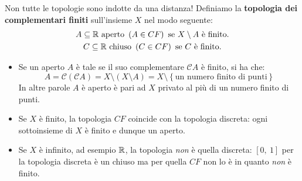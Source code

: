 \begin{attention}
	Non tutte le topologie sono indotte da una distanza! Definiamo la \textbf{topologia dei complementari finiti} sull'insieme $X$ nel modo seguente:
	\begin{gather*}
		A\subseteq \mathbb{R} \text{ aperto } \left(A\in CF\right) \text{ se }  X\setminus A \text{ è finito.}\\
		C\subseteq \mathbb{R} \text{ chiuso } \left(C\in CF\right) \text{ se }  C \text{ è finito.}
	\end{gather*}
	\begin{itemize}
		\item Se un aperto $A$ è tale se il suo complementare $\mathcal{C}A$ è finito, si ha che:
		\begin{equation}
			A=\mathcal{C}\left(\mathcal{C}A\right)=X\setminus\left(X\setminus A\right)=X\setminus\left\{\text{un numero finito di punti}\right\}
		\end{equation}
		In altre parole $A$ è aperto è pari ad $X$ privato al più di un numero finito di punti.
		\item Se $X$ è finito, la topologia $CF$ coincide con la topologia discreta: ogni sottoinsieme di $X$ è finito e dunque un aperto.
		\item Se $X$ è infinito, ad esempio $\mathbb{R}$, la topologia \textit{non} è quella discreta: $[0,\ 1]$ per la topologia discreta è un chiuso ma per quella $CF$ non lo è in quanto \textit{non} è finito.
	\end{itemize}
\vspace{-3mm}
\end{attention}

